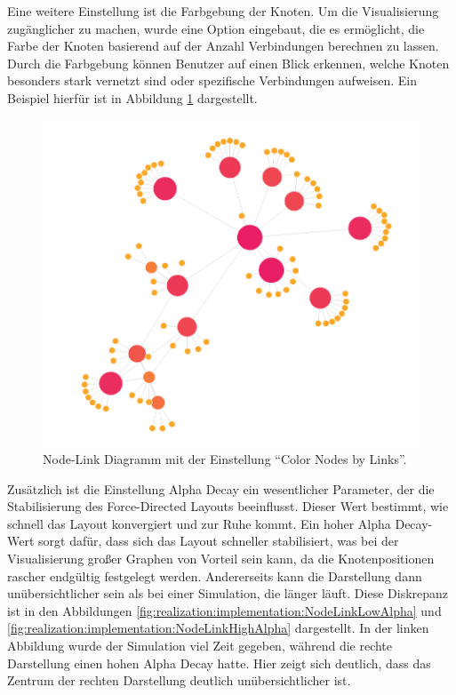 Eine weitere Einstellung ist die Farbgebung der Knoten. Um die Visualisierung zugänglicher zu machen, wurde eine Option eingebaut, die es ermöglicht, die Farbe der Knoten basierend auf der Anzahl Verbindungen berechnen zu lassen. Durch die Farbgebung können Benutzer auf einen Blick erkennen, welche Knoten besonders stark vernetzt sind oder spezifische Verbindungen aufweisen. Ein Beispiel hierfür ist in Abbildung \ref{fig:realization:implementation:ColorNodesByLinks} dargestellt.

\begin{figure}[h]
    \centering
    \includegraphics[height=.5\textwidth]{images/03/ColorNodesByLinks.png}
    \caption{Node-Link Diagramm mit der Einstellung \enquote{Color Nodes by Links}.}
    \label{fig:realization:implementation:ColorNodesByLinks}
\end{figure}

Zusätzlich ist die Einstellung Alpha Decay ein wesentlicher Parameter, der die Stabilisierung des Force-Directed Layouts beeinflusst. Dieser Wert bestimmt, wie schnell das Layout konvergiert und zur Ruhe kommt. Ein hoher Alpha Decay-Wert sorgt dafür, dass sich das Layout schneller stabilisiert, was bei der Visualisierung großer Graphen von Vorteil sein kann, da die Knotenpositionen rascher endgültig festgelegt werden. Andererseits kann die Darstellung dann unübersichtlicher sein als bei einer Simulation, die länger läuft. Diese Diskrepanz ist in den Abbildungen \ref{fig:realization:implementation:NodeLinkLowAlpha} und \ref{fig:realization:implementation:NodeLinkHighAlpha} dargestellt. In der linken Abbildung wurde der Simulation viel Zeit gegeben, während die rechte Darstellung einen hohen Alpha Decay hatte. Hier zeigt sich deutlich, dass das Zentrum der rechten Darstellung deutlich unübersichtlicher ist.

